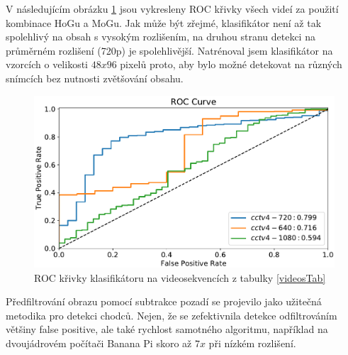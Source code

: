 V následujícím obrázku \ref{fig:rocCurve2} jsou vykresleny ROC křivky všech videí za použití kombinace HoGu a MoGu. Jak může být zřejmé, klasifikátor není až tak spolehlivý na obsah s vysokým rozlišením, na druhou stranu detekci na průměrném rozlišení (720p) je spolehlivější. Natrénoval jsem klasifikátor na vzorcích o velikosti $48x96$ pixelů proto, aby bylo možné detekovat na různých snímcích bez nutnosti zvětšování obsahu.   

\begin{figure}[H]
\centering
\includegraphics[width=16cm]{figures/roc2}
\caption{ROC křivky klasifikátoru na videosekvencích z tabulky \ref{videosTab}}
\label{fig:rocCurve2}
\end{figure}

Předfiltrování obrazu pomocí subtrakce pozadí se projevilo jako užitečná metodika pro detekci chodců. Nejen, že se zefektivnila detekce odfiltrováním většiny false positive, ale také rychlost samotného algoritmu, například na dvoujádrovém počítači Banana Pi skoro až $7x$ při nízkém rozlišení.  
